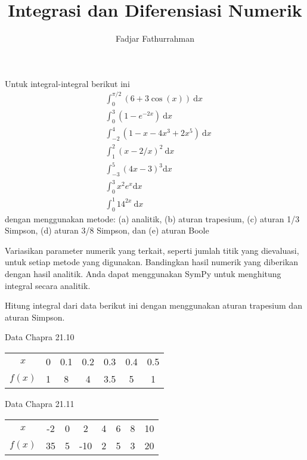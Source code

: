 



\title{Integrasi dan Diferensiasi Numerik}
\author{Fadjar Fathurrahman}
\date{}
\maketitle

\begin{soal}
Untuk integral-integral berikut ini
\begin{align}
& \int_{0}^{\pi/2} (6 + 3\cos(x))\ \mathrm{d}x \\
& \int_{0}^{3} (1 - e^{-2x})\ \mathrm{d}x \\
& \int_{-2}^{4} (1 - x - 4x^3 + 2x^5)\ \mathrm{d}x \\
& \int_{1}^{2} (x - 2/x)^2\ \mathrm{d}x \\
& \int_{-3}^{5} (4x - 3)^3 \mathrm{d}x \\
& \int_{0}^{3} x^2 e^x \mathrm{d}x \\
& \int_{0}^{1} 14^{2x}\ \mathrm{d}x
\end{align}
dengan menggunakan metode:
(a) analitik,
(b) aturan trapesium,
(c) aturan 1/3 Simpson,
(d) aturan 3/8 Simpson, dan
(e) aturan Boole

Variasikan parameter numerik yang terkait, seperti jumlah titik yang dievaluasi,
untuk setiap metode yang digunakan.
Bandingkan hasil numerik yang diberikan dengan hasil analitik.
Anda dapat menggunakan SymPy untuk menghitung integral secara analitik.
\end{soal}

\begin{soal}
Hitung integral dari data berikut ini dengan menggunakan aturan trapesium dan aturan
Simpson.

Data Chapra 21.10

{\centering
\begin{tabular}{|c|cccccc|}
\hline
$x$    & 0 & 0.1 & 0.2 & 0.3 & 0.4 & 0.5 \\
$f(x)$ & 1 & 8   & 4   & 3.5 & 5   & 1 \\
\hline
\end{tabular}
\par}

Data Chapra 21.11

{\centering
\begin{tabular}{|c|ccccccc|}
\hline
$x$    & -2 & 0 & 2 & 4 & 6 & 8 & 10 \\
$f(x)$ & 35 & 5 & -10 & 2 & 5 & 3 & 20 \\
\hline
\end{tabular}
\par}
\end{soal}


